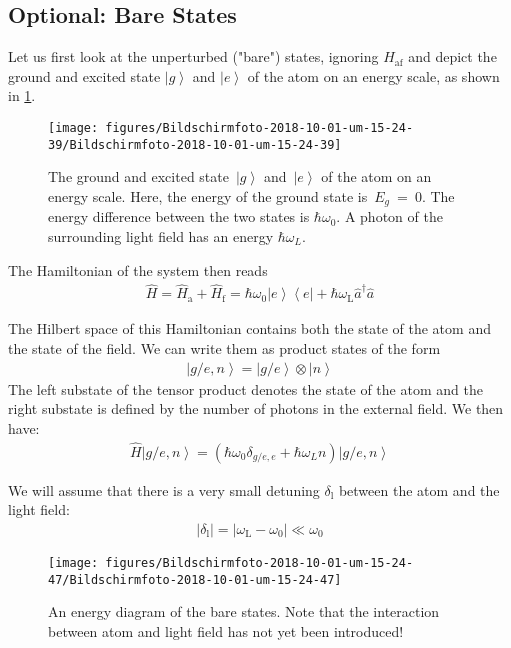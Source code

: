 \documentclass[10pt]{article}
\newcommand{\bra}[1]{\ensuremath{\left\langle#1\right|}}
\newcommand{\ket}[1]{\ensuremath{\left|#1\right\rangle}}
\begin{document}
\subsection{Optional: Bare States}
Let us first look at the unperturbed ("bare") states, ignoring $H_\textrm{af}$ and depict the ground and excited state $\ket{g}$ and $\ket{e}$ of the atom on an energy scale, as shown in \ref{231072}.
\begin{figure}[h!]
\begin{center}
\texttt{[image: figures/Bildschirmfoto-2018-10-01-um-15-24-39/Bildschirmfoto-2018-10-01-um-15-24-39]}
\caption{{The ground and excited state~\(\left|g\right\rangle\) and~\(\left|e\right\rangle\)
of the atom on an energy scale. Here, the energy of the ground state
is~\(E_g\ =\ 0\). The energy difference between the two states is
\(\hbar\omega_0\). A photon of the surrounding light field has an
energy \(\hbar\omega_L\).
{\label{231072}}%
}}
\end{center}
\end{figure}

The Hamiltonian of the system then reads
\begin{align}
\hat{H} = \hat{H}_\textrm{a} + \hat{H}_\textrm{f} = \hbar \omega_0 \ket{e} \bra{e} + \hbar \omega_\textrm{L} \hat{a}^\dag \hat{a} 
\end{align}

The Hilbert space of this Hamiltonian contains both the state of the atom and the state of the field. We can write them as product states of the form 
\begin{align}
\ket{g/e, n} = \ket{g/e} \otimes \ket{n}
\end{align}
The left substate of the tensor product denotes the state of the atom and the right substate is defined by the number of photons in the external field. We then have:
\begin{align}
\hat{H}\ket{g/e, n} = \left(\hbar\omega_0 \delta_{g/e,e}+\hbar\omega_L n\right)\ket{g/e, n}
\end{align}

We will assume that there is a very small detuning $\delta_\textrm{l}$ between the atom and the light field:
\begin{align}
|\delta_\textrm{l}| = |\omega_\textrm{L}- \omega_0 | \ll \omega_0
\end{align}
\begin{figure}[h!]
\begin{center}
\texttt{[image: figures/Bildschirmfoto-2018-10-01-um-15-24-47/Bildschirmfoto-2018-10-01-um-15-24-47]}
\caption{{An energy diagram of the bare states. Note that the interaction between
atom and light field has not yet been introduced!
{\label{871990}}%
}}
\end{center}
\end{figure}
\end{document}
